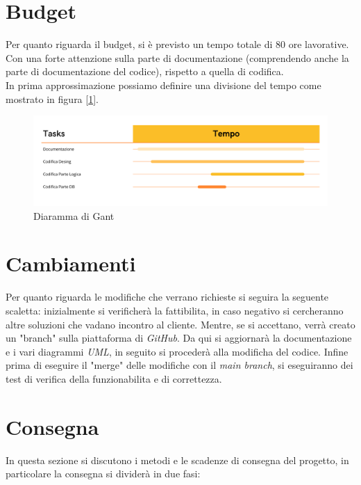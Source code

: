 \documentclass{book}
\begin{document}
\section{Budget}

    Per quanto riguarda il budget, si è previsto un tempo totale di 80 ore lavorative. Con una forte attenzione sulla parte di documentazione (comprendendo anche la parte di documentazione del codice), rispetto a quella di codifica.\\

    In prima approssimazione possiamo definire una divisione del tempo come mostrato in figura [\ref{fig: diagramma_gant}]. 
    \begin{figure}[h]
        \centering
        \includegraphics[width = 1\linewidth]{Diagramma_Gant.jpg}
        \caption{Diaramma di Gant}
        \label{fig: diagramma_gant}    
    \end{figure}

\section{Cambiamenti}

    Per quanto riguarda le modifiche che verrano richieste si seguira la seguente scaletta: inizialmente si verificherà la fattibilita, in caso negativo si cercheranno altre soluzioni che vadano incontro al cliente. Mentre, se si accettano, verrà creato un "branch" sulla piattaforma di \textit{GitHub}. Da qui si aggiornarà la documentazione e i vari diagrammi \textit{UML}, in seguito si procederà alla modificha del codice. Infine prima di eseguire il "merge" delle modifiche con il \textit{main branch}, si eseguiranno dei test di verifica della funzionabilita e di correttezza.

\section{Consegna}


    In questa sezione si discutono i metodi e le scadenze di consegna del progetto, in particolare la consegna si dividerà in due fasi:
\end{document}
